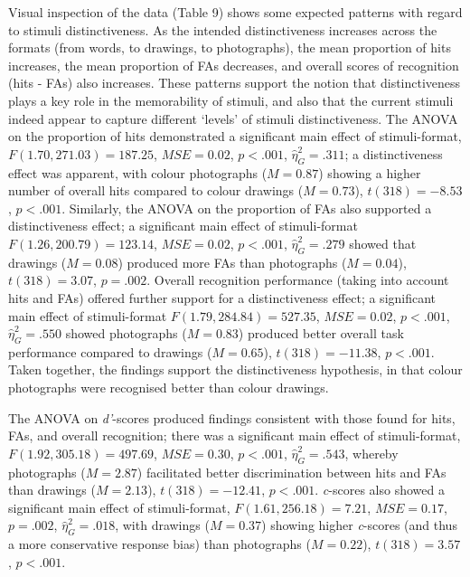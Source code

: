 \documentclass[
  11pt,
]{article}
\begin{document}
Visual inspection of the data (Table 9) shows some expected patterns
with regard to stimuli distinctiveness. As the intended distinctiveness
increases across the formats (from words, to drawings, to photographs),
the mean proportion of hits increases, the mean proportion of FAs
decreases, and overall scores of recognition (hits - FAs) also
increases. These patterns support the notion that distinctiveness plays
a key role in the memorability of stimuli, and also that the current
stimuli indeed appear to capture different `levels' of stimuli
distinctiveness. The ANOVA on the proportion of hits demonstrated a
significant main effect of stimuli-format, \(F(1.70, 271.03) = 187.25\),
\(\mathit{MSE} = 0.02\), \(p < .001\), \(\hat{\eta}^2_G = .311\); a
distinctiveness effect was apparent, with colour photographs
(\(M = 0.87\)) showing a higher number of overall hits compared to
colour drawings (\(M = 0.73\)), \(t(318) = -8.53\), \(p < .001\).
Similarly, the ANOVA on the proportion of FAs also supported a
distinctiveness effect; a significant main effect of stimuli-format
\(F(1.26, 200.79) = 123.14\), \(\mathit{MSE} = 0.02\), \(p < .001\),
\(\hat{\eta}^2_G = .279\) showed that drawings (\(M = 0.08\)) produced
more FAs than photographs (\(M = 0.04\)), \(t(318) = 3.07\),
\(p = .002\). Overall recognition performance (taking into account hits
and FAs) offered further support for a distinctiveness effect; a
significant main effect of stimuli-format \(F(1.79, 284.84) = 527.35\),
\(\mathit{MSE} = 0.02\), \(p < .001\), \(\hat{\eta}^2_G = .550\) showed
photographs (\(M = 0.83\)) produced better overall task performance
compared to drawings (\(M = 0.65\)), \(t(318) = -11.38\), \(p < .001\).
Taken together, the findings support the distinctiveness hypothesis, in
that colour photographs were recognised better than colour drawings.

The ANOVA on \emph{d'}-scores produced findings consistent with those
found for hits, FAs, and overall recognition; there was a significant
main effect of stimuli-format, \(F(1.92, 305.18) = 497.69\),
\(\mathit{MSE} = 0.30\), \(p < .001\), \(\hat{\eta}^2_G = .543\),
whereby photographs (\(M = 2.87\)) facilitated better discrimination
between hits and FAs than drawings (\(M = 2.13\)), \(t(318) = -12.41\),
\(p < .001\). \emph{c}-scores also showed a significant main effect of
stimuli-format, \(F(1.61, 256.18) = 7.21\), \(\mathit{MSE} = 0.17\),
\(p = .002\), \(\hat{\eta}^2_G = .018\), with drawings (\(M = 0.37\))
showing higher \emph{c}-scores (and thus a more conservative response
bias) than photographs (\(M = 0.22\)), \(t(318) = 3.57\), \(p < .001\).
\end{document}

